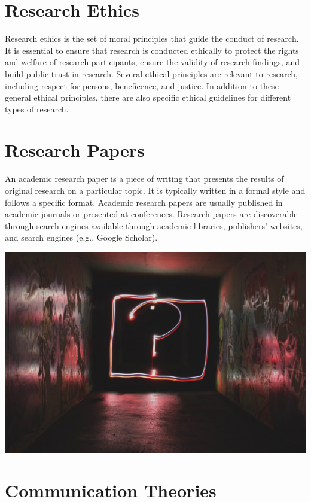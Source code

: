\documentclass[
  b5paper]{book}
\begin{document}
\hypertarget{research-ethics}{%
\section*{Research Ethics}\label{research-ethics}}

Research ethics is the set of moral principles that guide the conduct of research. It is essential to ensure that research is conducted ethically to protect the rights and welfare of research participants, ensure the validity of research findings, and build public trust in research. Several ethical principles are relevant to research, including respect for persons, beneficence, and justice. In addition to these general ethical principles, there are also specific ethical guidelines for different types of research.

\hypertarget{research-papers}{%
\section*{Research Papers}\label{research-papers}}

An academic research paper is a piece of writing that presents the results of original research on a particular topic. It is typically written in a formal style and follows a specific format. Academic research papers are usually published in academic journals or presented at conferences. Research papers are discoverable through search engines available through academic libraries, publishers' websites, and search engines (e.g., Google Scholar).

\includegraphics[width=1\textwidth,height=\textheight]{images/question_mark.jpg}

\hypertarget{communication-theories}{%
\section*{Communication Theories}\label{communication-theories}}
\end{document}
